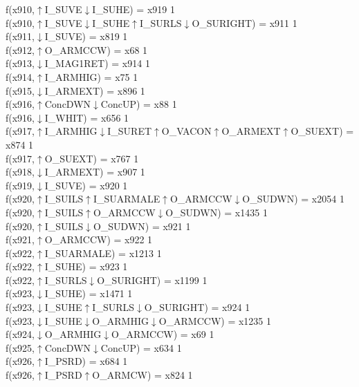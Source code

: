 f(x910,$\uparrow$I\_SUVE$\downarrow$I\_SUHE) = x919 {1} \\
f(x910,$\uparrow$I\_SUVE$\downarrow$I\_SUHE$\uparrow$I\_SURLS$\downarrow$O\_SURIGHT) = x911 {1} \\
f(x911,$\downarrow$I\_SUVE) = x819 {1} \\
f(x912,$\uparrow$O\_ARMCCW) = x68 {1} \\
f(x913,$\downarrow$I\_MAG1RET) = x914 {1} \\
f(x914,$\uparrow$I\_ARMHIG) = x75 {1} \\
f(x915,$\downarrow$I\_ARMEXT) = x896 {1} \\
f(x916,$\uparrow$ConcDWN$\downarrow$ConcUP) = x88 {1} \\
f(x916,$\downarrow$I\_WHIT) = x656 {1} \\
f(x917,$\uparrow$I\_ARMHIG$\downarrow$I\_SURET$\uparrow$O\_VACON$\uparrow$O\_ARMEXT$\uparrow$O\_SUEXT) = x874 {1} \\
f(x917,$\uparrow$O\_SUEXT) = x767 {1} \\
f(x918,$\downarrow$I\_ARMEXT) = x907 {1} \\
f(x919,$\downarrow$I\_SUVE) = x920 {1} \\
f(x920,$\uparrow$I\_SUILS$\uparrow$I\_SUARMALE$\uparrow$O\_ARMCCW$\downarrow$O\_SUDWN) = x2054 {1} \\
f(x920,$\uparrow$I\_SUILS$\uparrow$O\_ARMCCW$\downarrow$O\_SUDWN) = x1435 {1} \\
f(x920,$\uparrow$I\_SUILS$\downarrow$O\_SUDWN) = x921 {1} \\
f(x921,$\uparrow$O\_ARMCCW) = x922 {1} \\
f(x922,$\uparrow$I\_SUARMALE) = x1213 {1} \\
f(x922,$\uparrow$I\_SUHE) = x923 {1} \\
f(x922,$\uparrow$I\_SURLS$\downarrow$O\_SURIGHT) = x1199 {1} \\
f(x923,$\downarrow$I\_SUHE) = x1471 {1} \\
f(x923,$\downarrow$I\_SUHE$\uparrow$I\_SURLS$\downarrow$O\_SURIGHT) = x924 {1} \\
f(x923,$\downarrow$I\_SUHE$\downarrow$O\_ARMHIG$\downarrow$O\_ARMCCW) = x1235 {1} \\
f(x924,$\downarrow$O\_ARMHIG$\downarrow$O\_ARMCCW) = x69 {1} \\
f(x925,$\uparrow$ConcDWN$\downarrow$ConcUP) = x634 {1} \\
f(x926,$\uparrow$I\_PSRD) = x684 {1} \\
f(x926,$\uparrow$I\_PSRD$\uparrow$O\_ARMCW) = x824 {1} \\
